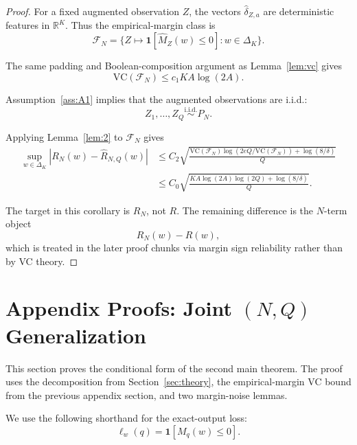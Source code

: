 \documentclass{article} %
\providecommand{\simplex}{\Delta_K}
\providecommand{\Risk}{R}
\providecommand{\Fcal}{\mathcal{F}}
\providecommand{\VC}{\mathrm{VC}}
\providecommand{\dhat}{\widehat{\delta}}
\providecommand{\Mhat}{\widehat{M}}
\begin{document}
\begin{proof}
For a fixed augmented observation \(Z\), the vectors \(\dhat_{Z,a}\) are
deterministic features in \(\mathbb{R}^K\). Thus the empirical-margin class is
\begin{equation}
\label{eq:cor-rn-class}
\Fcal_N
=
\Big\{
Z\mapsto \mathbf 1[\Mhat_Z(w)\le 0] : w\in\simplex
\Big\}.
\end{equation}

The same padding and Boolean-composition argument as Lemma~\ref{lem:vc} gives
\begin{equation}
\label{eq:cor-rn-vc}
\VC(\Fcal_N)
\le
c_1 K A\log(2A).
\end{equation}

Assumption~\ref{ass:A1} implies that the augmented observations are i.i.d.:
\begin{equation}
\label{eq:cor-rn-iid}
Z_1,\ldots,Z_Q \stackrel{\mathrm{i.i.d.}}{\sim} P_N .
\end{equation}

Applying Lemma~\ref{lem:2} to \(\Fcal_N\) gives
\begin{align}
\sup_{w\in\simplex}
\left|
\Risk_N(w)-\widehat{\Risk}_{N,Q}(w)
\right|
&\le
C_2
\sqrt{
\frac{
\VC(\Fcal_N)\log(2eQ/\VC(\Fcal_N))+\log(8/\delta)
}{Q}
}
\label{eq:cor-rn-a}
\\
&\le
C_0
\sqrt{
\frac{
K A\log(2A)\log(2Q)+\log(8/\delta)
}{Q}
}.
\label{eq:cor-rn-b}
\end{align}

The target in this corollary is \(\Risk_N\), not \(\Risk\). The remaining
difference is the \(N\)-term object
\begin{equation}
\label{eq:cor-rn-not-r}
\Risk_N(w)-\Risk(w),
\end{equation}
which is treated in the later proof chunks via margin sign reliability rather
than by VC theory.
\end{proof}

\section{Appendix Proofs: Joint \texorpdfstring{$(N,Q)$}{(N,Q)} Generalization}
\label{app:proofs-gen}

This section proves the conditional form of the second main theorem.  The proof
uses the decomposition from Section~\ref{sec:theory}, the empirical-margin VC
bound from the previous appendix section, and two margin-noise lemmas.

We use the following shorthand for the exact-output loss:
\begin{equation}
\label{eq:app2-loss-exact}
\ell_w(q)
=
\mathbf 1\!\left[M_q(w)\le 0\right].
\end{equation}
\end{document}
